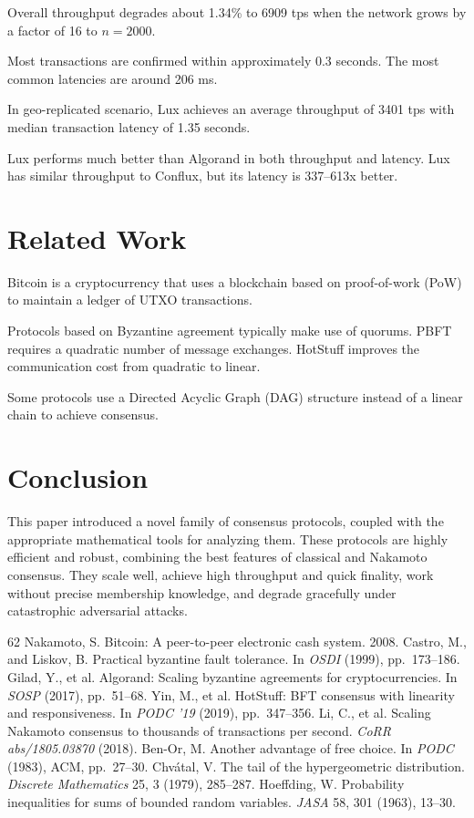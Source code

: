 \documentclass[11pt]{article}
\begin{document}
Overall throughput degrades about
1.34\% to 6909 tps when the network grows by a factor of 16 to
$n = 2000$.

Most transactions are confirmed
within approximately 0.3 seconds. The most common latencies
are around 206 ms.

In geo-replicated scenario, Lux achieves an average throughput
of 3401 tps with median transaction latency of 1.35 seconds.

Lux performs much better than Algorand in both
throughput and latency. Lux has similar throughput to Conflux, but its latency
is 337--613x better.

\section{Related Work}\label{sec:related}

Bitcoin is a cryptocurrency that uses a blockchain based
on proof-of-work (PoW) to maintain a ledger of UTXO transactions.

Protocols based on Byzantine agreement typically make use of quorums.
PBFT requires a quadratic number of message exchanges.
HotStuff improves the communication cost from quadratic to linear.

Some protocols use a Directed Acyclic Graph (DAG)
structure instead of a linear chain to achieve consensus.

\section{Conclusion}\label{sec:conclusion}

This paper introduced a novel family of consensus protocols,
coupled with the appropriate mathematical tools for analyzing them. These protocols are highly efficient and robust,
combining the best features of classical and Nakamoto consensus. They scale well, achieve high throughput and quick finality,
work without precise membership knowledge, and degrade
gracefully under catastrophic adversarial attacks.

\begin{thebibliography}{62}
 Nakamoto, S. Bitcoin: A peer-to-peer electronic cash system. 2008.
 Castro, M., and Liskov, B. Practical byzantine fault tolerance. In \emph{OSDI} (1999), pp.~173--186.
 Gilad, Y., et al. Algorand: Scaling byzantine agreements for cryptocurrencies. In \emph{SOSP} (2017), pp.~51--68.
 Yin, M., et al. HotStuff: BFT consensus with linearity and responsiveness. In \emph{PODC '19} (2019), pp.~347--356.
 Li, C., et al. Scaling Nakamoto consensus to thousands of transactions per second. \emph{CoRR abs/1805.03870} (2018).
 Ben-Or, M. Another advantage of free choice. In \emph{PODC} (1983), ACM, pp.~27--30.
 Chv\'{a}tal, V. The tail of the hypergeometric distribution. \emph{Discrete Mathematics} 25, 3 (1979), 285--287.
 Hoeffding, W. Probability inequalities for sums of bounded random variables. \emph{JASA} 58, 301 (1963), 13--30.
\end{thebibliography}
\end{document}
